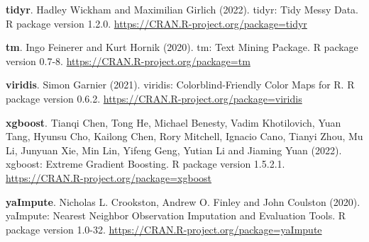 \documentclass[
  10pt,
]{scrbook}
\begin{document}
\textbf{tidyr}. Hadley Wickham and Maximilian Girlich (2022). tidyr: Tidy Messy Data. R package version 1.2.0. \url{https://CRAN.R-project.org/package=tidyr}

\textbf{tm}. Ingo Feinerer and Kurt Hornik (2020). tm: Text Mining Package. R package version 0.7-8. \url{https://CRAN.R-project.org/package=tm}

\textbf{viridis}. Simon Garnier (2021). viridis: Colorblind-Friendly Color Maps for R. R package version 0.6.2. \url{https://CRAN.R-project.org/package=viridis}

\textbf{xgboost}. Tianqi Chen, Tong He, Michael Benesty, Vadim Khotilovich, Yuan Tang, Hyunsu Cho, Kailong Chen, Rory Mitchell, Ignacio Cano, Tianyi Zhou, Mu Li, Junyuan Xie, Min Lin, Yifeng Geng, Yutian Li and Jiaming Yuan (2022). xgboost: Extreme Gradient Boosting. R package version 1.5.2.1. \url{https://CRAN.R-project.org/package=xgboost}

\textbf{yaImpute}. Nicholas L. Crookston, Andrew O. Finley and John Coulston (2020). yaImpute: Nearest Neighbor Observation Imputation and Evaluation Tools. R package version 1.0-32. \url{https://CRAN.R-project.org/package=yaImpute}

\printindex
\thispagestyle{empty}
\end{document}
